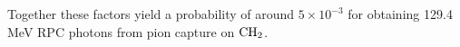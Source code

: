 Together these factors yield a probability of around $ 5 \times 10^{-3} $
for obtaining 129.4 MeV RPC photons from pion capture on $\rm{CH_2}$.





